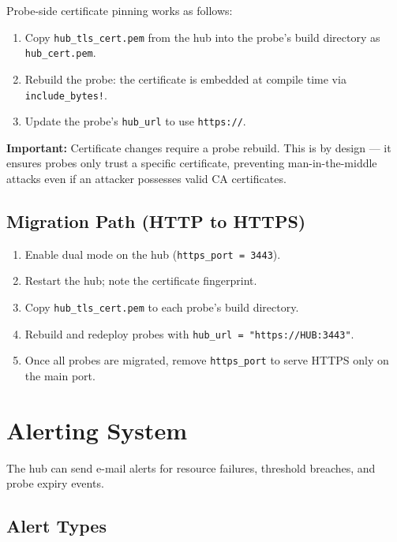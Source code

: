 \documentclass[12pt]{report}
\begin{document}
Probe-side certificate pinning works as follows:

\begin{enumerate}
    \item Copy \texttt{hub\_tls\_cert.pem} from the hub into the probe's build
          directory as \texttt{hub\_cert.pem}.
    \item Rebuild the probe: the certificate is embedded at compile time via
          \texttt{include\_bytes!}.
    \item Update the probe's \texttt{hub\_url} to use \texttt{https://}.
\end{enumerate}

\textbf{Important:} Certificate changes require a probe rebuild. This is by
design --- it ensures probes only trust a specific certificate, preventing
man-in-the-middle attacks even if an attacker possesses valid CA certificates.

\subsection{Migration Path (HTTP to HTTPS)}

\begin{enumerate}
    \item Enable dual mode on the hub (\texttt{https\_port = 3443}).
    \item Restart the hub; note the certificate fingerprint.
    \item Copy \texttt{hub\_tls\_cert.pem} to each probe's build directory.
    \item Rebuild and redeploy probes with \texttt{hub\_url =
          "https://HUB:3443"}.
    \item Once all probes are migrated, remove \texttt{https\_port} to serve
          HTTPS only on the main port.
\end{enumerate}

\section{Alerting System}

The hub can send e-mail alerts for resource failures, threshold breaches, and
probe expiry events.

\subsection{Alert Types}
\end{document}
